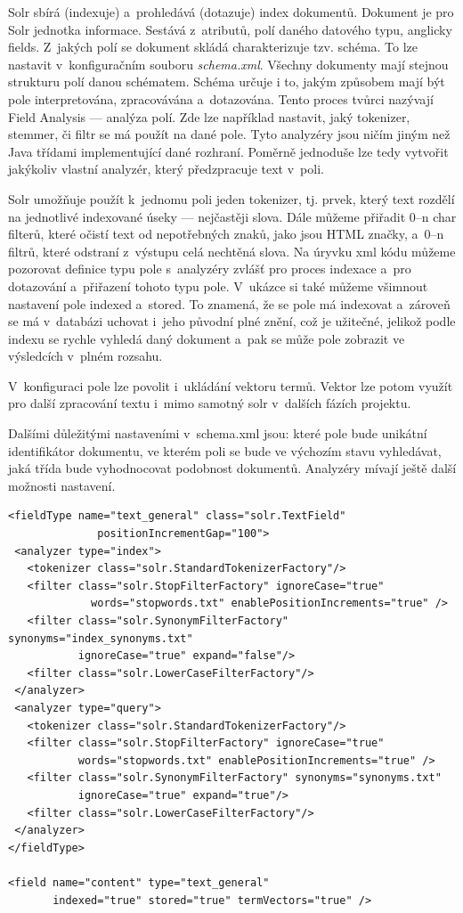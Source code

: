 Solr sbírá (indexuje) a~prohledává (dotazuje) index dokumentů. Dokument je pro Solr jednotka informace. Sestává z~atributů, polí daného datového typu, anglicky fields.  Z~jakých polí se dokument skládá charakterizuje tzv. schéma. To lze nastavit v~konfiguračním souboru \emph{schema.xml}. Všechny dokumenty mají stejnou strukturu polí danou schématem. Schéma určuje i to, jakým způsobem mají být pole interpretována, zpracovávána a~dotazována. Tento proces tvůrci nazývají Field Analysis — analýza polí. Zde lze například nastavit, jaký tokenizer, stemmer, či filtr se má použít na dané pole. Tyto analyzéry jsou ničím jiným než Java třídami implementující dané rozhraní. Poměrně jednoduše lze tedy vytvořit jakýkoliv vlastní analyzér, který předzpracuje text v~poli.

Solr umožňuje použít k~jednomu poli jeden tokenizer, tj. prvek, který text rozdělí na jednotlivé indexované úseky — nejčastěji slova. Dále můžeme přiřadit 0–n char filterů, které očistí text od nepotřebných znaků, jako jsou HTML značky, a~0–n filtrů, které odstraní z~výstupu celá nechtěná slova. Na úryvku xml kódu můžeme pozorovat definice typu pole s~analyzéry zvlášť pro proces indexace a~pro dotazování a~přiřazení tohoto typu pole. V~ukázce si také můžeme všimnout nastavení pole indexed a~stored. To znamená, že se pole má indexovat a~zároveň se má v~databázi uchovat i~jeho původní plné znění, což je užitečné, jelikož podle indexu se rychle vyhledá daný dokument a~pak se může pole zobrazit ve výsledcích v~plném rozsahu.

V~konfiguraci pole lze povolit i~ukládání vektoru termů. Vektor lze potom využít pro další zpracování textu i~mimo samotný solr v~dalších fázích projektu.

Dalšími důležitými nastaveními v~schema.xml jsou: které pole bude unikátní identifikátor dokumentu, ve kterém poli se bude ve výchozím stavu vyhledávat, jaká třída bude vyhodnocovat podobnost dokumentů. Analyzéry mívají ještě další možnosti nastavení.

\begin{verbatim}
<fieldType name="text_general" class="solr.TextField" 
			  positionIncrementGap="100">
 <analyzer type="index">
   <tokenizer class="solr.StandardTokenizerFactory"/>
   <filter class="solr.StopFilterFactory" ignoreCase="true" 
 		     words="stopwords.txt" enablePositionIncrements="true" />
   <filter class="solr.SynonymFilterFactory" synonyms="index_synonyms.txt" 
           ignoreCase="true" expand="false"/>
   <filter class="solr.LowerCaseFilterFactory"/>
 </analyzer>
 <analyzer type="query">
   <tokenizer class="solr.StandardTokenizerFactory"/>
   <filter class="solr.StopFilterFactory" ignoreCase="true" 
           words="stopwords.txt" enablePositionIncrements="true" />
   <filter class="solr.SynonymFilterFactory" synonyms="synonyms.txt"
           ignoreCase="true" expand="true"/>
   <filter class="solr.LowerCaseFilterFactory"/>
 </analyzer>
</fieldType>

<field name="content" type="text_general" 
       indexed="true" stored="true" termVectors="true" />
\end{verbatim}

